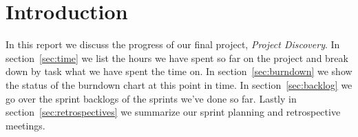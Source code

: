 \section{Introduction}\label{sec:introduction}

In this report we discuss the progress of our final project, \emph{Project Discovery}. In section~\ref{sec:time} we list the hours we have spent so far on the project and break down by task what we have spent the time on. In section~\ref{sec:burndown} we show the status of the burndown chart at this point in time. In section~\ref{sec:backlog} we go over the sprint backlogs of the sprints we've done so far. Lastly in section~\ref{sec:retrospectives} we summarize our sprint planning and retrospective meetings. 